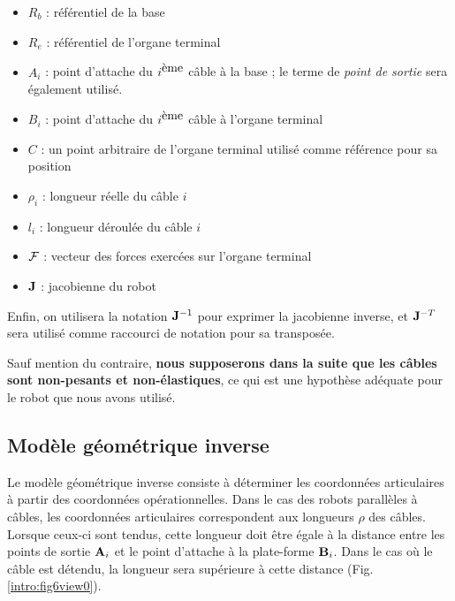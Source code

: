 \begin{itemize}
 \item $R_b$ : référentiel de la base
 \item $R_e$ : référentiel de l'organe terminal
 \item $A_i$ : point d'attache du $i^{\hbox{ème}}$ câble à la base ; le terme de 
{\it point de sortie} sera également utilisé.
 \item $B_i$ : point d'attache du $i^{\hbox{ème}}$ câble à l'organe terminal
 \item $C$ : un point arbitraire de l'organe terminal utilisé comme référence 
pour sa position
 \item $\rho_i$ : longueur réelle du câble $i$
 \item $l_i$ : longueur déroulée du câble $i$
 \item $\boldmath {\mathcal F}$ : vecteur des forces exercées sur l'organe 
terminal
 \item $\bf J$ : jacobienne du robot
\end{itemize}
Enfin, on utilisera la notation ${\bf J}^{-1}$ pour exprimer la jacobienne 
inverse, et ${\bf J}^{-T}$ sera utilisé comme raccourci de notation pour sa 
transposée.

Sauf mention du contraire, {\bf nous supposerons dans la suite que les câbles 
sont non-pesants et non-élastiques}, ce qui est une hypothèse adéquate pour le 
robot que nous avons utilisé.

\subsection{Modèle géométrique inverse} \label{chap0-1-1}

Le modèle géométrique inverse consiste à déterminer les coordonnées articulaires 
à partir des coordonnées opérationnelles. Dans le cas des robots parallèles à 
câbles, les coordonnées articulaires correspondent aux longueurs $\rho$ des 
câbles. Lorsque ceux-ci sont tendus, cette longueur doit être égale à la 
distance entre les points de sortie ${\bf A}_i$ et le point d'attache à la 
plate-forme ${\bf B}_i$. Dans le cas où le câble est détendu, la longueur sera 
supérieure à cette distance (Fig.\ref{intro:fig6view0}).\\

